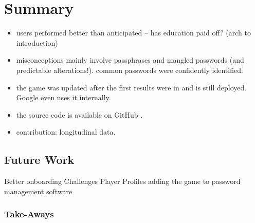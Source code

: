 \section{Summary}
\begin{itemize}
	\item users performed better than anticipated -- has education paid off? (arch to introduction)
	\item misconceptions mainly involve passphrases and mangled passwords (and predictable alterations!). common passwords were confidently identified. 
	\item the game was updated after the first results were in and is still deployed. Google even uses it internally. 
	\item the source code is available on GitHub .
	\item contribution: longitudinal data.
\end{itemize}


\subsection{Future Work}
Better onboarding
Challenges
Player Profiles 
adding the game to password management software


\subsubsection{Take-Aways}



